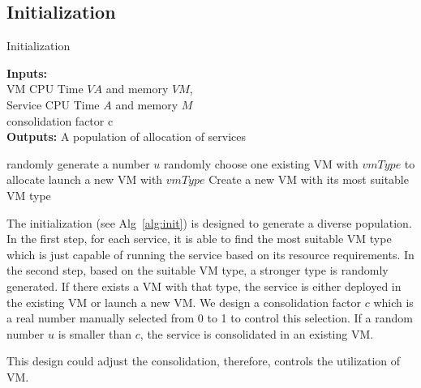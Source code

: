 \subsection{Initialization}
\begin{algorithm}[!htb]
 \caption{Initialization}
 \footnotesize
 \textbf{Inputs:} \\
  VM CPU Time $VA$ and memory $VM$, \\
  Service CPU Time $A$ and memory $M$ \\
  consolidation factor c \\
 \textbf{Outputs:}
  A population of allocation of services

 \begin{algorithmic}[1]
      \STATE randomly generate a number $u$
      \STATE randomly choose one existing VM with $vmType$ to allocate
      \ELSE
      \STATE launch a new VM with $vmType$
      \ENDIF
    \ELSE
      \STATE Create a new VM with its most suitable VM type
    \ENDIF

  \ENDFOR
 \end{algorithmic}
 \label{alg:init}
\end{algorithm}


The initialization (see Alg~\ref{alg:init}) is designed to generate a diverse population.
In the first step, for each service, it is able to find the most suitable VM type which is just capable of running the service based on its resource requirements. 
In the second step, based on the suitable VM type, a stronger type is randomly generated. If there exists a VM with that type, the service is either deployed in the 
existing VM or launch a new VM. We design a consolidation factor $c$ which is a real number manually selected from 0 to 1 to control this selection. If a
random number $u$ is smaller than $c$, the service is consolidated in an existing VM.

This design could adjust the consolidation, therefore, controls the utilization of VM.

